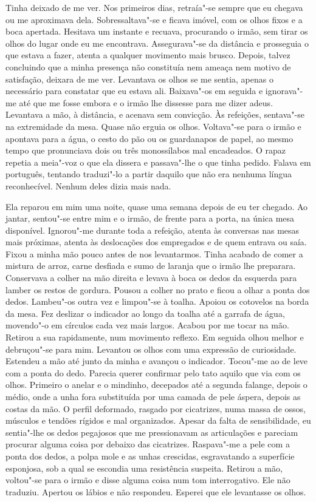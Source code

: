 Tinha deixado de me ver. Nos primeiros dias, retraía"-se sempre que eu
chegava ou me aproximava dela. Sobressaltava"-se e ficava imóvel, com os
olhos fixos e a boca apertada. Hesitava um instante e recuava,
procurando o irmão, sem tirar os olhos do lugar onde eu me encontrava.
Assegurava"-se da distância e prosseguia o que estava a fazer, atenta a
qualquer movimento mais brusco. Depois, talvez concluindo que a minha
presença não constituía nem ameaça nem motivo de satisfação, deixara de
me ver. Levantava os olhos se me sentia, apenas o necessário para
constatar que eu estava ali. Baixava"-os em seguida e ignorava"-me até
que me fosse embora e o irmão lhe dissesse para me dizer adeus.
Levantava a mão, à distância, e acenava sem convicção. Às refeições,
sentava"-se na extremidade da mesa. Quase não erguia os olhos.
Voltava"-se para o irmão e apontava para a água, o cesto do pão ou os
guardanapos de papel, ao mesmo tempo que pronunciava dois ou três
monossílabos mal encadeados. O rapaz repetia a meia"-voz o que ela
dissera e passava"-lhe o que tinha pedido. Falava em português, tentando
traduzi"-lo a partir daquilo que não era nenhuma língua reconhecível.
Nenhum deles dizia mais nada.

Ela reparou em mim uma noite, quase uma semana depois de eu ter chegado.
Ao jantar, sentou"-se entre mim e o irmão, de frente para a porta, na
única mesa disponível. Ignorou"-me durante toda a refeição, atenta às
conversas nas mesas mais próximas, atenta às deslocações dos empregados
e de quem entrava ou saía. Fixou a minha mão pouco antes de nos
levantarmos. Tinha acabado de comer a mistura de arroz, carne desfiada e
sumo de laranja que o irmão lhe preparara. Conservava a colher na mão
direita e levava à boca os dedos da esquerda para lamber os restos de
gordura. Pousou a colher no prato e ficou a olhar a ponta dos dedos.
Lambeu"-os outra vez e limpou"-se à toalha. Apoiou os cotovelos na borda
da mesa. Fez deslizar o indicador ao longo da toalha até a garrafa de
água, movendo"-o em círculos cada vez mais largos. Acabou por me tocar
na mão. Retirou a sua rapidamente, num movimento reflexo. Em seguida
olhou melhor e debruçou"-se para mim. Levantou os olhos com uma
expressão de curiosidade. Estendeu a mão até junto da minha e avançou o
indicador. Tocou"-me ao de leve com a ponta do dedo. Parecia querer
confirmar pelo tato aquilo que via com os olhos. Primeiro o anelar e o
mindinho, decepados até a segunda falange, depois o médio, onde a unha
fora substituída por uma camada de pele áspera, depois as costas da mão.
O perfil deformado, rasgado por cicatrizes, numa massa de ossos,
músculos e tendões rígidos e mal organizados. Apesar da falta de
sensibilidade, eu sentia"-lhe os dedos pegajosos que me pressionavam as
articulações e pareciam procurar alguma coisa por debaixo das
cicatrizes. Raspava"-me a pele com a ponta dos dedos, a polpa mole e as
unhas crescidas, esgravatando a superfície esponjosa, sob a qual se
escondia uma resistência suspeita. Retirou a mão, voltou"-se para o
irmão e disse alguma coisa num tom interrogativo. Ele não traduziu.
Apertou os lábios e não respondeu. Esperei que ele levantasse os olhos.

